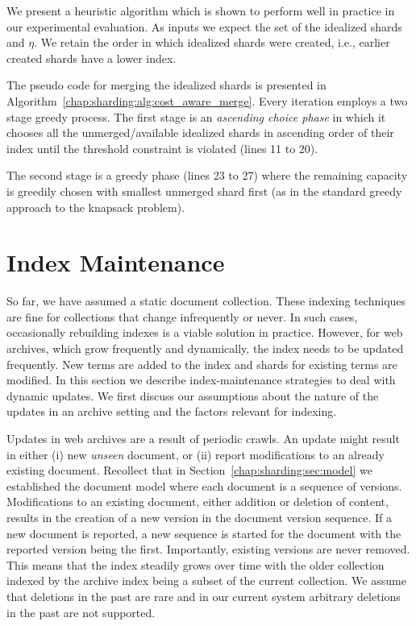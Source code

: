 We present a heuristic algorithm which is shown to perform well in
practice in our experimental evaluation. As inputs we expect the set
of the idealized shards and $\eta$. We retain the order
in which idealized shards were created, i.e., earlier created shards
have a lower index.

The pseudo code for merging the idealized shards is presented in
Algorithm~\ref{chap:sharding:alg:cost_aware_merge}. Every iteration employs a two
stage greedy process. The first stage is an \emph{ascending choice
  phase} in which it chooses all the unmerged/available idealized
shards in ascending order of their index until the threshold
constraint is violated (lines 11 to 20).

The second stage is a greedy phase (lines 23 to 27) where the
remaining capacity is greedily chosen with smallest unmerged shard
first (as in the standard greedy approach to the knapsack problem).

\section{Index Maintenance}
\label{chap:sharding:sec:maintenance}
So far, we have assumed a static document collection. These indexing techniques are fine for collections that change infrequently or never. In such cases, occasionally rebuilding indexes is a viable solution in practice. However, for web archives, which grow frequently and dynamically, the index needs to be updated frequently. New terms are added to the index and shards for existing terms are modified. In this section we describe index-maintenance strategies to deal with dynamic updates. We first discuss our assumptions about the nature of the updates in an archive setting and the factors relevant for indexing.


Updates in web archives are a result of periodic crawls. An update might result in either (i) new \emph{unseen} document, or (ii) report  modifications to an already existing document. Recollect that in Section~\ref{chap:sharding:sec:model} we established the document model where each document is a sequence of versions. Modifications to an existing document, either addition or deletion of content, results in the creation of a new version in the document version sequence. If a new document is reported, a new sequence is started for the document with the reported version being the first. Importantly, existing versions are never removed. This means that the index steadily grows over time with the older collection indexed by the archive index being a subset of the current collection. We assume that deletions in the past are rare and in our current system arbitrary deletions in the past are not supported.

